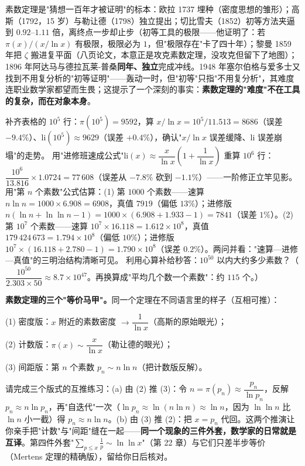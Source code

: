 \begin{lishi}
素数定理是"猜想一百年才被证明"的标本：欧拉 1737 埋种（密度思想的雏形）；高斯（1792，15 岁）与勒让德（1798）独立提出；切比雪夫（1852）初等方法夹逼到 $0.92$--$1.11$ 倍，离终点一步却止步（初等工具的极限——他证明了：若 $\pi(x)/(x/\ln x)$ 有极限，极限必为 $1$，但"极限存在"卡了四十年）；黎曼 1859 年把 $\zeta$ 搬进复平面（八页论文，本意正是攻克素数定理，没攻克但留下了地图）；1896 年阿达马与德拉瓦莱-普桑\textbf{同年、独立}完成冲线。1948 年塞尔伯格与爱多士又找到不用复分析的"初等证明"——轰动一时，但"初等"只指"不用复分析"，其难度连职业数学家都望而生畏；这提示了一个深刻的事实：\textbf{素数定理的"难度"不在工具的复杂，而在对象本身}。
\end{lishi}

\begin{dongshou}
\begin{itemize}
  \yisi 补齐表格的 $10^5$ 行：$\pi(10^5) = 9592$，算 $x/\ln x = 10^5/11.513 = 8686$（误差 $-9.4\%$）、$\mathrm{li}(10^5) \approx 9629$（误差 $+0.4\%$），确认"$x/\ln x$ 误差缓降、$\mathrm{li}$ 误差崩塌"的走势。
  \yier 用"进修班速成公式"$\mathrm{li}(x) \approx \dfrac{x}{\ln x}\left(1 + \dfrac1{\ln x}\right)$ 重算 $10^6$ 行：$\dfrac{10^6}{13.816}\times1.0724 = 77\,608$（误差从 $-7.8\%$ 砍到 $-1.1\%$）——一阶修正立竿见影。
  \yier 用"第 $n$ 个素数"公式估算：(1) 第 $1000$ 个素数——速算 $n\ln n = 1000\times6.908 = 6908$，真值 $7919$（偏低 $13\%$）；进修版 $n(\ln n + \ln\ln n - 1) = 1000\times(6.908+1.933-1) = 7841$（误差 $1\%$）。(2) 第 $10^7$ 个素数——速算 $10^7\times16.118 = 1.612\times10^8$，真值 $179\,424\,673 = 1.794\times10^8$（偏低 $10\%$）；进修版 $10^7\times(16.118+2.780-1) = 1.790\times10^8$（误差 $0.2\%$）。两问并看："速算—进修—真值"的三明治结构清晰可见。
  \yisi 利用心算补给秒答：$10^{50}$ 以内大约多少素数？（$\dfrac{10^{50}}{2.303\times50} \approx 8.7\times10^{47}$。再换算成"平均几个数一个素数"：约 $115$ 个。）
\end{itemize}
\end{dongshou}

\begin{shaonao}
\textbf{素数定理的三个"等价马甲"。}同一个定理在不同语言里的样子（互相可推）：

(1) 密度版：$x$ 附近的素数密度 $\to \dfrac1{\ln x}$（高斯的原始眼光）；

(2) 计数版：$\pi(x) \sim \dfrac{x}{\ln x}$（勒让德的眼光）；

(3) 间距版：第 $n$ 个素数 $p_n \sim n\ln n$（把计数版反解）。

请完成三个版式的互推练习：(a) 由 (2) 推 (3)：令 $n = \pi(p_n) \approx \dfrac{p_n}{\ln p_n}$，反解 $p_n \approx n\ln p_n$，再"自迭代"一次（$\ln p_n \approx \ln(n\ln n) \approx \ln n$，因为 $\ln\ln n$ 比 $\ln n$ 小一截）得 $p_n \approx n\ln n$。(b) 由 (3) 推 (2)：把 $x = p_n$ 代回。这两个推演让你亲手把"计数"与"间距"缝在一起——\textbf{同一个现象的三件外套，数学家的日常就是互译}。第四件外套"$\sum_{p\le x}\tfrac1p \sim \ln\ln x$"（第 22 章）与它们只差半步等价（Mertens 定理的精确版），留给你日后核对。
\end{shaonao}

